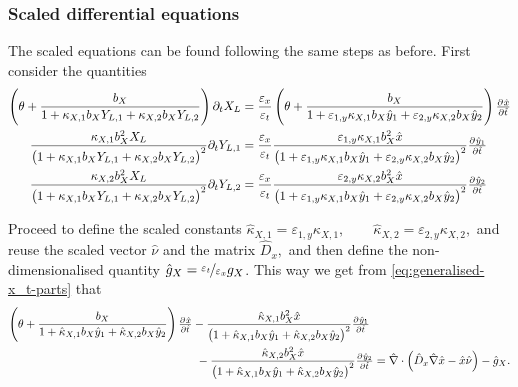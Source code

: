 \documentclass[11pt]{article}
\numberwithin{equation}{section}
\begin{document}
\subsubsection{Scaled differential equations}

The scaled equations can be found following the same steps as before. First consider the quantities
\begin{subequations}
\label{eq:generalised-x_t-parts}
\begin{align}
    \left( \theta + \frac{b_X}{1 + \kappa_{X,1} b_{X} Y_{L,1} + \kappa_{X,2} b_{X} Y_{L,2}} \right) \partial_t X_L &= \frac{\varepsilon_x}{\varepsilon_t} \left( \theta + \frac{b_X}{1 + \varepsilon_{1,y} \kappa_{X,1} b_{X} \hat{y}_1 + \varepsilon_{2,y} \kappa_{X,2} b_{X} \hat{y}_2 } \right)  \pd{\hat{x}}{\hat{t}}
    \\
    \frac{\kappa_{X,1} b_X^2 X_L}{\big(1 + \kappa_{X,1} b_{X} Y_{L,1} + \kappa_{X,2} b_{X} Y_{L,2} \big)^2} \partial_t Y_{L,1} 
    &=
    \frac{\varepsilon_x}{\varepsilon_t} \frac{\varepsilon_{1,y} \kappa_{X,1} b_X^2 \hat{x}}{\big(1+ \varepsilon_{1,y} \kappa_{X,1} b_X \hat{y}_1 + \varepsilon_{2,y} \kappa_{X,2} b_X \hat{y}_2 \big)^2} \pd{\hat y_1}{\hat t}
    \\
    \frac{ \kappa_{X,2} b_X^2 X_L }{\big(1 + \kappa_{X,1} b_X Y_{L,1} + \kappa_{X,2} b_X Y_{L,2}\big)^2} \partial_t Y_{L,2}
    &=
    \frac{\varepsilon_x}{\varepsilon_t} \frac{\varepsilon_{2,y} \kappa_{X,2} b_X^2 \hat{x}}{\big(1+ \varepsilon_{1,y} \kappa_{X,1} b_X \hat{y}_1 + \varepsilon_{2,y} \kappa_{X,2} b_X \hat{y}_2 \big)^2} \pd{\hat y_2}{\hat t}
\end{align}
\end{subequations}


Proceed to define the scaled constants
\(
    \hat{\kappa}_{X,1} = \varepsilon_{1,y} \kappa_{X,1},
    \qquad
    \hat{\kappa}_{X,2} = \varepsilon_{2,y} \kappa_{X,2},
\) and reuse the scaled vector \(\hat{\nu}\) and the matrix
\(
    \hat{D}_x ,
\)
and then define the non-dimensionalised quantity \( \hat{g}_X = \nicefrac{\varepsilon_t}{\varepsilon_x} g_X\). This way we get from \eqref{eq:generalised-x_t-parts} that
\begin{equation}
\begin{aligned}
    \left( \theta + \frac{b_X}{1 + \hat{\kappa}_{X,1} b_{X} \hat{y}_1 + \hat{\kappa}_{X,2} b_{X} \hat{y}_2 } \right)  \pd{\hat{x}}{\hat{t}}
    &
    -\frac{\hat{\kappa}_{X,1} b_X^2 \hat{x}}{\big(1+ \hat{\kappa}_{X,1} b_X \hat{y}_1 + \hat{\kappa}_{X,2} b_X \hat{y}_2 \big)^2} \pd{\hat y_1}{\hat t}
    \\
    &\,\,
    -\frac{\hat{\kappa}_{X,2} b_X^2 \hat{x}}{\big(1+ \hat{\kappa}_{X,1} b_X \hat{y}_1 + \hat{\kappa}_{X,2} b_X \hat{y}_2 \big)^2} \pd{\hat y_2}{\hat t}
    =
    \hat{\nabla}
    \cdot
    \left( 
        \hat{D}_x \hat{\nabla} \hat{x} - \hat{x} \hat{\nu}
    \right)
    - \hat{g}_X.
\end{aligned}
\end{equation}
\end{document}
